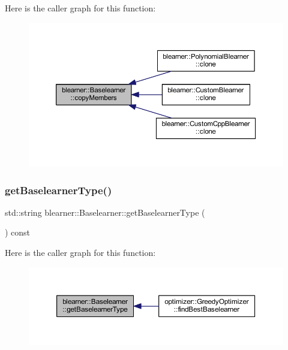 Here is the caller graph for this function\+:\nopagebreak
\begin{figure}[H]
\begin{center}
\leavevmode
\includegraphics[width=350pt]{classblearner_1_1_baselearner_ae8f114ca7c497f03c80de5981c7f811d_icgraph}
\end{center}
\end{figure}
\mbox{\label{classblearner_1_1_baselearner_acec1a791f94eed39d2662c245e7f6b51}} 
\subsubsection{\texorpdfstring{get\+Baselearner\+Type()}{getBaselearnerType()}}
{\footnotesize\ttfamily std\+::string blearner\+::\+Baselearner\+::get\+Baselearner\+Type (\begin{DoxyParamCaption}{ }\end{DoxyParamCaption}) const}

Here is the caller graph for this function\+:\nopagebreak
\begin{figure}[H]
\begin{center}
\leavevmode
\includegraphics[width=350pt]{classblearner_1_1_baselearner_acec1a791f94eed39d2662c245e7f6b51_icgraph}
\end{center}
\end{figure}
\mbox{\label{classblearner_1_1_baselearner_af3a360bb039447610e9928956384c05d}} 
